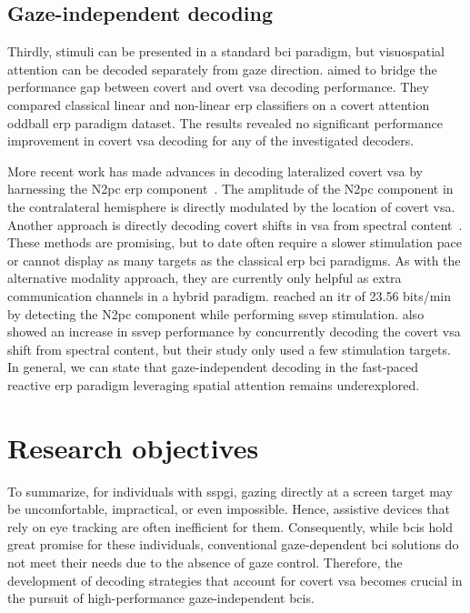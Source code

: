 \subsection{Gaze-independent decoding}
\label{sec:gaze-independence/sota/decoding}

Thirdly, stimuli can be presented in a standard \ac{bci} paradigm, but visuospatial
attention can be decoded separately from gaze direction.
\textcite{Aloise2012} aimed to bridge the performance gap between covert and
overt \ac{vsa} decoding performance.
They compared classical linear and non-linear \ac{erp} classifiers on a covert
attention oddball \ac{erp} paradigm dataset.
The results revealed no significant performance improvement in covert \ac{vsa}
decoding for any of the investigated decoders.

More recent work has made advances in decoding lateralized covert
\ac{vsa} by harnessing the N2pc \ac{erp}
component~\cite{Thiery2016,Reichert2020b,Wang2022}.
The amplitude of the N2pc component in the contralateral hemisphere is directly modulated
by the location of covert \ac{vsa}.
Another approach is directly decoding covert shifts in \ac{vsa} from spectral
content~\cite{Tonin2013}.
These methods are promising, but to date often require a slower stimulation pace or cannot display as
many targets as the classical \ac{erp} \ac{bci} paradigms.
As with the alternative modality approach, they are currently only helpful as
extra communication channels in a hybrid paradigm.
\textcite{Xu2016} reached an \ac{itr} of 23.56 bits/min by detecting the N2pc
component while performing \ac{ssvep} stimulation.
\textcite{Egan2017} also showed an increase in \ac{ssvep} performance by
concurrently decoding the covert \ac{vsa} shift from spectral content, but
their study only used a few stimulation targets.
In general, we can state that gaze-independent decoding in the fast-paced reactive \ac{erp} paradigm
leveraging spatial attention remains underexplored.

\section{Research objectives}
\label{sec:gaze-independence/objectives}

To summarize, for individuals with \ac{sspgi}, gazing directly at a screen target may
be uncomfortable, impractical, or even impossible.
Hence, assistive devices that rely on eye tracking are often inefficient for
them.
Consequently, while \acp{bci} hold great promise for these individuals, conventional
gaze-dependent \ac{bci} solutions do not meet their needs due to the absence of gaze
control.
Therefore, the development of decoding strategies that account for covert
\ac{vsa} becomes crucial in the pursuit of high-performance gaze-independent
\acp{bci}.

